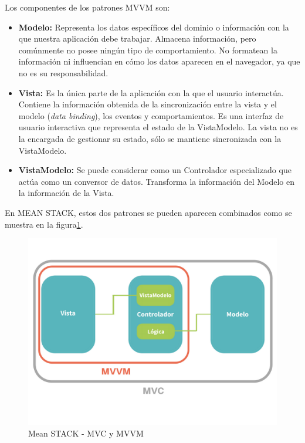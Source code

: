Los componentes de los patrones MVVM son:


\begin{itemize}
\item \textbf{Modelo:} Representa los datos específicos del dominio o información con la que nuestra aplicación debe trabajar. Almacena información, pero comúnmente no posee ningún tipo de comportamiento. No formatean la información ni influencian en cómo los datos aparecen en el navegador, ya que no es su responsabilidad.
\item \textbf{Vista:} Es la única parte de la aplicación con la que el usuario interactúa. Contiene la información obtenida de la sincronización entre la vista y el modelo (\textit{data binding}\cite{data_binding_w3s}), los eventos y comportamientos. Es una interfaz de usuario interactiva que representa el estado de la VistaModelo. La vista no es la encargada de gestionar su estado, sólo se mantiene sincronizada con la VistaModelo.
\item \textbf{VistaModelo:} Se puede considerar como un Controlador especializado que actúa como un conversor de datos. Transforma la información del Modelo en la información de la Vista\cite{fernandomonteiro2014}. 
\end{itemize}

En MEAN STACK, estos dos patrones se pueden aparecen combinados como se muestra en la figura\ref{fig:mvc_mvvm}.


\begin{figure}[htbp] 
    \centering
    \includegraphics[width=1\textwidth]{figuras/MVC_MVVM.png}
    \caption{Mean STACK - MVC y MVVM}
    \label{fig:mvc_mvvm}
\end{figure}	


